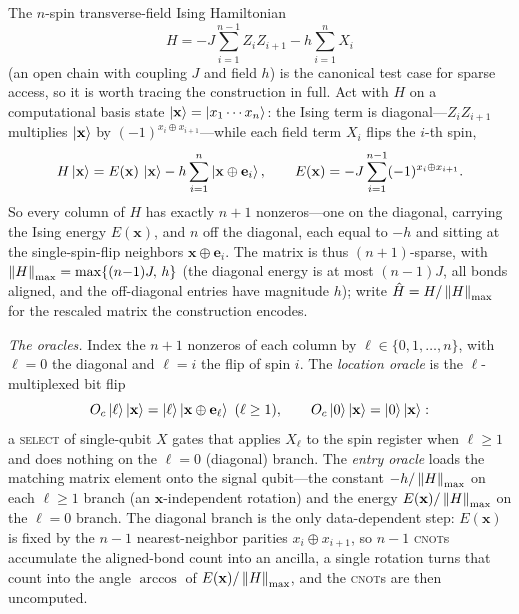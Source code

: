 \begin{example}
\label{exa:lec06-ising}
The $n$-spin transverse-field Ising Hamiltonian
\[
  H=-J\sum_{i=1}^{n-1} Z_iZ_{i+1}-h\sum_{i=1}^{n} X_i
\]
(an open chain with coupling $J$ and field $h$) is the canonical test case for
sparse access, so it is worth tracing the construction in full. Act with $H$ on a
computational basis state $\ket{\mathbf x}=\ket{x_1\cdots x_n}$: the Ising term is
diagonal---$Z_iZ_{i+1}$ multiplies $\ket{\mathbf x}$ by $(-1)^{x_i\oplus x_{i+1}}$---while
each field term $X_i$ flips the $i$-th spin,
\[
  H\ket{\mathbf x}=E(\mathbf x)\,\ket{\mathbf x}-h\sum_{i=1}^{n}\ket{\mathbf x\oplus\mathbf e_i},
  \qquad E(\mathbf x)=-J\sum_{i=1}^{n-1}(-1)^{x_i\oplus x_{i+1}}.
\]
So every column of $H$ has exactly $n{+}1$ nonzeros---one on the diagonal, carrying the
Ising energy $E(\mathbf x)$, and $n$ off the diagonal, each equal to $-h$ and sitting at the
single-spin-flip neighbors $\mathbf x\oplus\mathbf e_i$. The matrix is thus $(n{+}1)$-sparse,
with $\left\lVert H \right\rVert_{\max}=\max\{(n{-}1)J,\,h\}$ (the diagonal energy is at most $(n{-}1)J$, all
bonds aligned, and the off-diagonal entries have magnitude $h$); write
$\hat H=H/\left\lVert H \right\rVert_{\max}$ for the rescaled matrix the construction encodes.

\emph{The oracles.} Index the $n{+}1$ nonzeros of each column by $\ell\in\{0,1,\dots,n\}$,
with $\ell=0$ the diagonal and $\ell=i$ the flip of spin $i$. The \emph{location oracle} is
the $\ell$-multiplexed bit flip
\[
  O_c\ket{\ell}\ket{\mathbf x}=\ket{\ell}\ket{\mathbf x\oplus\mathbf e_\ell}\ (\ell\ge1),
  \qquad O_c\ket{0}\ket{\mathbf x}=\ket{0}\ket{\mathbf x}:
\]
a \textsc{select} of single-qubit $X$ gates that applies $X_\ell$ to the spin register when
$\ell\ge1$ and does nothing on the $\ell=0$ (diagonal) branch. The \emph{entry oracle} loads
the matching matrix element onto the signal qubit---the constant $-h/\left\lVert H \right\rVert_{\max}$ on each
$\ell\ge1$ branch (an $\mathbf x$-independent rotation) and the energy
$E(\mathbf x)/\left\lVert H \right\rVert_{\max}$ on the $\ell=0$ branch. The diagonal branch is the only
data-dependent step: $E(\mathbf x)$ is fixed by the $n{-}1$ nearest-neighbor parities
$x_i\oplus x_{i+1}$, so $n{-}1$ \textsc{cnot}s accumulate the aligned-bond count into an
ancilla, a single rotation turns that count into the angle $\arccos$ of
$E(\mathbf x)/\left\lVert H \right\rVert_{\max}$, and the \textsc{cnot}s are then uncomputed.


\end{example}
